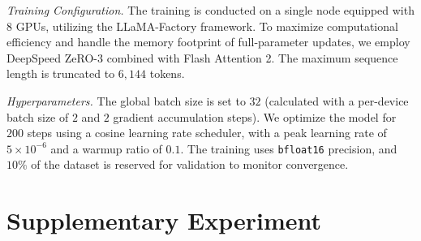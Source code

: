 \documentclass[11pt, a4paper]{lumia}
\begin{document}
\noindent\textit{Training Configuration.} 
The training is conducted on a single node equipped with 8 GPUs, utilizing the LLaMA-Factory framework. To maximize computational efficiency and handle the memory footprint of full-parameter updates, we employ DeepSpeed ZeRO-3 combined with Flash Attention 2. The maximum sequence length is truncated to $6,144$ tokens.

\noindent\textit{Hyperparameters.} 
The global batch size is set to $32$ (calculated with a per-device batch size of $2$ and $2$ gradient accumulation steps). We optimize the model for $200$ steps using a cosine learning rate scheduler, with a peak learning rate of $5 \times 10^{-6}$ and a warmup ratio of $0.1$. The training uses \texttt{bfloat16} precision, and $10\%$ of the dataset is reserved for validation to monitor convergence.

\section{Supplementary Experiment}
\end{document}
